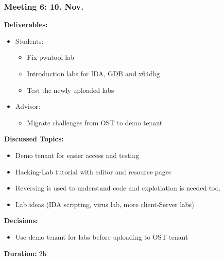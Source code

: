 \newpage
\subsubsection*{Meeting 6: 10. Nov.}
\textbf{Deliverables:}
\begin{itemize}
    \item Students:
    \begin{itemize}
        \item Fix pwntool lab
        \item Introduction labs for IDA, GDB and x64dbg
        \item Test the newly uploaded labs
    \end{itemize}
    \item Advisor:
    \begin{itemize}
        \item Migrate challenges from OST to demo tenant
    \end{itemize}
\end{itemize} 
\textbf{Discussed Topics:}
\begin{itemize}
    \item Demo tenant for easier access and testing
    \item Hacking-Lab tutorial with editor and resource pages
    \item Reversing is used to understand code and explotiation is needed too.
    \item Lab ideas (IDA scripting, virus lab, more client-Server labs)
\end{itemize}
\textbf{Decisions:}
\begin{itemize}
    \item Use demo tenant for labs before uploading to OST tenant    
\end{itemize}
\textbf{Duration:} 2h

\newpage
